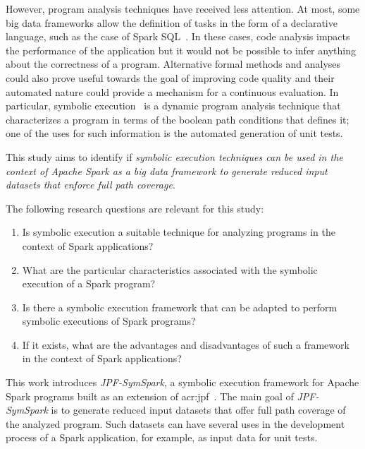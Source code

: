 However, program analysis techniques have received less attention. At most, some big data frameworks allow the definition of tasks in the form of a declarative language, such as the case of Spark SQL~\cite{Armbrust2015}. In these cases, code analysis impacts the performance of the application but it would not be possible to infer anything about the correctness of a program. Alternative formal methods and analyses could also prove useful towards the goal of improving code quality and their automated nature could provide a mechanism for a continuous evaluation. In particular, symbolic execution~\cite{Hoare1969,King1976} is a dynamic program analysis technique that characterizes a program in terms of the boolean path conditions that defines it; one of the uses for such information is the automated generation of unit tests. 

This study aims to identify if \textit{symbolic execution techniques can be used in the context of Apache Spark as a big data framework to generate reduced input datasets that enforce full path coverage}.

The following research questions are relevant for this study:

\begin{enumerate}
	\item Is symbolic execution a suitable technique for analyzing programs in the context of Spark applications?
	\item What are the particular characteristics associated with the symbolic execution of a Spark program?
	\item Is there a symbolic execution framework that can be adapted to perform symbolic executions of Spark programs?
	\item If it exists, what are the advantages and disadvantages of such a framework in the context of Spark applications?
\end{enumerate}

\label{sec:contributions}

This work introduces \textit{JPF-SymSpark}, a symbolic execution framework for Apache Spark programs built as an extension of \acrfull{acr:jpf}~\cite{Visser2003}. The main goal of \textit{JPF-SymSpark} is to generate reduced input datasets that offer full path coverage of the analyzed program. Such datasets can have several uses in the development process of a Spark application, for example, as input data for unit tests.

